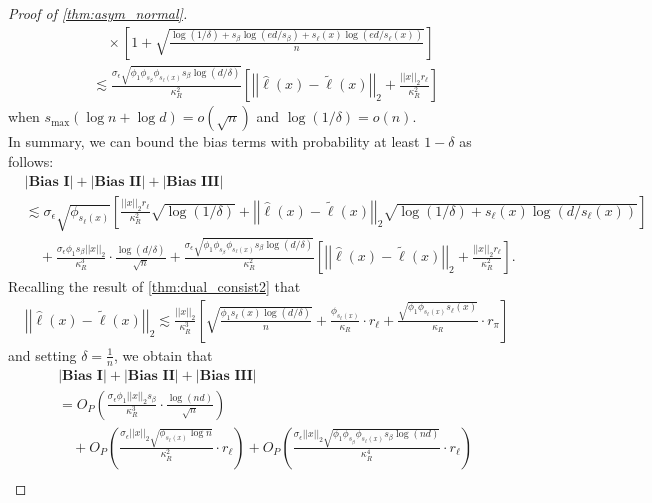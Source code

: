 \documentclass[ejsv2,noshowframe]{imsart}
\theoremstyle{plain}
\theoremstyle{definition}
\theoremstyle{remark}
\newcommand{\norm}[1]{\left|\left| #1 \right|\right|}
\renewcommand{\hat}{\widehat}
\renewcommand{\tilde}{\widetilde}
\begin{document}
\begin{proof}[Proof of \autoref{thm:asym_normal}]
\begin{align*}
		&\quad \times \left[1 + \sqrt{\frac{\log(1/\delta) + s_{\beta}\log(ed/s_{\beta}) + s_{\ell}(x) \log(ed/s_{\ell}(x))}{n}} \right]\\
		&\lesssim \frac{\sigma_{\epsilon}\sqrt{\phi_1 \phi_{s_{\beta}} \phi_{s_{\ell}(x)} s_{\beta}\log(d/\delta)}}{\kappa_R^2} \left[\norm{\hat{\ell}(x) -\tilde{\ell}(x)}_2 + \frac{\norm{x}_2 r_{\ell}}{\kappa_R^2} \right]
	\end{align*}
	when $s_{\max}\left(\log n + \log d\right) = o(\sqrt{n})$ and $\log(1/\delta) = o(n)$.\\
	
	In summary, we can bound the bias terms with probability at least $1-\delta$ as follows:
	\begin{align*}
		&\left|\textbf{Bias I}\right| + \left|\textbf{Bias II}\right| + \left|\textbf{Bias III}\right| \\
		&\lesssim \sigma_{\epsilon} \sqrt{\phi_{s_{\ell}(x)}}\left[\frac{\norm{x}_2 r_{\ell}}{\kappa_R^2} \sqrt{\log(1/\delta)} + \norm{\hat{\ell}(x) - \tilde{\ell}(x)}_2 \sqrt{\log(1/\delta) + s_{\ell}(x) \log(d/s_{\ell}(x))}\right] \\
		&\quad + \frac{\sigma_{\epsilon}\phi_1 s_{\beta} \norm{x}_2}{\kappa_R^3} \cdot \frac{\log(d/\delta)}{\sqrt{n}} + \frac{\sigma_{\epsilon}\sqrt{\phi_1 \phi_{s_{\beta}} \phi_{s_{\ell}(x)} s_{\beta}\log(d/\delta)}}{\kappa_R^2} \left[\norm{\hat{\ell}(x) -\tilde{\ell}(x)}_2 + \frac{\norm{x}_2 r_{\ell}}{\kappa_R^2} \right].
	\end{align*}
	Recalling the result of \autoref{thm:dual_consist2} that
	\begin{align*}
		&\norm{\hat{\ell}(x) - \tilde{\ell}(x)}_2 \lesssim \frac{\norm{x}_2}{\kappa_R^3}\left[ \sqrt{\frac{\phi_1 s_{\ell}(x)\log(d/\delta)}{n}} + \frac{\phi_{s_{\ell}(x)}}{\kappa_R} \cdot r_{\ell} + \frac{\sqrt{\phi_1 \phi_{s_{\ell}(x)} s_{\ell}(x)}}{\kappa_R} \cdot  r_{\pi} \right]
	\end{align*}
	and setting $\delta=\frac{1}{n}$, we obtain that
	\begin{align*}
		&\left|\textbf{Bias I}\right| + \left|\textbf{Bias II}\right| + \left|\textbf{Bias III}\right| \\
		&=O_P\left(\frac{\sigma_{\epsilon}\phi_1 \norm{x}_2 s_{\beta}}{\kappa_R^3} \cdot \frac{\log(nd)}{\sqrt{n}} \right) \\
		&\quad + O_P\left(\frac{\sigma_{\epsilon}\norm{x}_2\sqrt{\phi_{s_{\ell}(x)} \log n}}{\kappa_R^2} \cdot r_{\ell} \right) + O_P\left(\frac{\sigma_{\epsilon}\norm{x}_2\sqrt{\phi_1 \phi_{s_{\beta}} \phi_{s_{\ell}(x)} s_{\beta} \log(nd)}}{\kappa_R^4} \cdot r_{\ell}\right) \\

\end{align*}
\end{proof}
\end{document}
